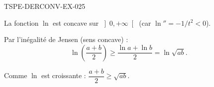 \begin{corrige}{TSPE-DERCONV-EX-025}

La fonction $\ln$ est concave sur $\left]0, +\infty\right[$ (car $\ln'' = -1/t^2 < 0$).


Par l'inégalité de Jensen (sens concave) :
\[ \ln\!\left(\frac{a+b}{2}\right) \geq \frac{\ln a + \ln b}{2} = \ln\sqrt{ab}. \]

Comme $\ln$ est croissante : $\dfrac{a+b}{2} \geq \sqrt{ab}$.

\end{corrige}
